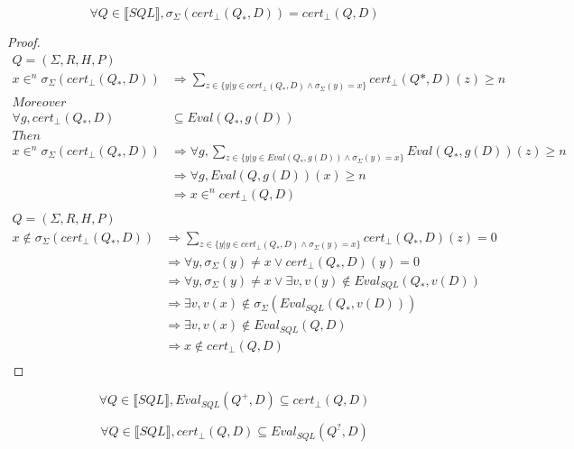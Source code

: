 \begin{mylem}
	$$\forall Q \in \llbracket SQL \rrbracket, \sigma_\Sigma(cert_{\bot}(Q_*,D)) = cert_{\bot}(Q,D)$$ 
\end{mylem}

\begin{proof}
	\begin{align*}
		Q = (\Sigma,R,H,P) \\
		x \in^n \sigma_\Sigma(cert_{\bot}(Q_*,D)) & \Rightarrow \sum_{z \in \{y | y \in cert_{\bot}(Q_*,D) \land \sigma_\Sigma(y) = x \} }{cert_{\bot}(Q*,D)(z)} \geq n \\
		Moreover \\
		\forall g, cert_\bot(Q_*,D) &  \subseteq Eval(Q_*,g(D)) \\
		Then \\
		x \in^n \sigma_\Sigma(cert_{\bot}(Q_*,D)) & \Rightarrow \forall g , \sum_{z \in \{y | y \in Eval(Q_*,g(D)) \land \sigma_\Sigma(y) = x \} }{Eval(Q_*,g(D)) (z)} \geq n \\
		& \Rightarrow \forall g, Eval(Q,g(D))(x) \geq n \\
		& \Rightarrow x \in^n cert_\bot(Q,D) \\
	\end{align*}
	\begin{align*}
		Q = (\Sigma,R,H,P) \\
		x \notin \sigma_\Sigma(cert_{\bot}(Q_*,D)) & \Rightarrow \sum_{z \in \{y | y \in cert_{\bot}(Q_*,D) \land \sigma_\Sigma(y) = x \} }{cert_{\bot}(Q_*,D)(z)} = 0 \\
		& \Rightarrow \forall y, \sigma_{\Sigma}(y) \neq x  \lor cert_{\bot}(Q_*,D)(y) = 0 \\
		& \Rightarrow \forall y, \sigma_{\Sigma}(y) \neq x  \lor \exists v, v(y) \notin Eval_{SQL}(Q_*,v(D)) \\
		& \Rightarrow \exists v, v(x) \notin \sigma_{\Sigma}(Eval_{SQL}(Q_*,v(D))) \\
		& \Rightarrow \exists v, v(x) \notin Eval_{SQL}(Q,D) \\
		& \Rightarrow x \notin cert_\bot(Q,D) \\
	\end{align*}
\end{proof}

\begin{myprop}
	\label{prop2}
	$$\forall Q \in \llbracket SQL \rrbracket, Eval_{SQL}(Q^+,D) \subseteq cert_\bot(Q,D)$$
\end{myprop}
\begin{myprop}
	\label{prop3}
	$$\forall Q \in \llbracket SQL \rrbracket, cert_\bot(Q,D) \subseteq Eval_{SQL}(Q^?,D)$$
\end{myprop}


